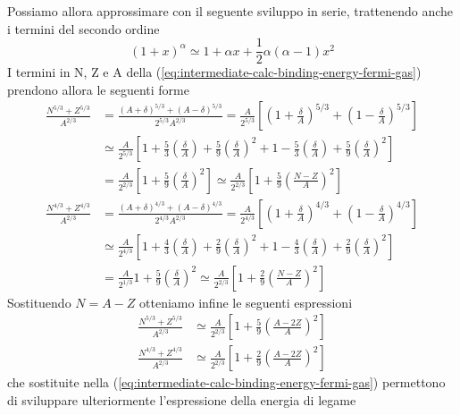 Possiamo allora approssimare con il seguente sviluppo in serie, trattenendo anche i termini del secondo ordine
\[
(1 + x)^{\alpha} \simeq 1 + \alpha x + \frac{1}{2} \alpha (\alpha - 1)x^{2}
\]
I termini in N, Z e A della (\ref{eq:intermediate-calc-binding-energy-fermi-gas}) prendono allora le seguenti forme
\begin{align*}
	\frac{N^{5/3}+Z^{5/3}}{ A^{2/3}} & = \frac{(A+\delta)^{5/3} + (A-\delta)^{5/3}}{2^{5/3} A^{2/3}} = \frac{A}{2^{5/3}} \left[ \left( 1+\frac{\delta}{A} \right)^{5/3} +\left( 1 - \frac{\delta}{A} \right)^{5/3} \right] \\
	& \simeq \frac{A}{2^{5/3}} \left[ 1 + \frac{5}{3}\left( \frac{\delta}{A} \right) + \frac{5}{9} \left( \frac{\delta}{A} \right)^{2} + 1 - \frac{5}{3} \left( \frac{\delta}{A} \right) + \frac{5}{9} \left( \frac{\delta}{A} \right)^{2} \right] \\
	& = \frac{A}{2^{2/3}}  \left[ 1+\frac{5}{9} \left( \frac{\delta}{A} \right)^{2} \right]
	\simeq \frac{A}{2^{2/3}} \left[ 1 + \frac{5}{9} \left( \frac{N-Z}{A} \right)^{2} \right]
\end{align*}
\begin{align*}
	\frac{N^{4/3}+Z^{4/3}}{ A^{2/3}} & = \frac{(A+\delta)^{4/3} + (A-\delta)^{4/3}}{2^{4/3} A^{2/3}} = \frac{A}{2^{4/3}} \left[ \left( 1+\frac{\delta}{A} \right)^{4/3} +\left( 1 - \frac{\delta}{A} \right)^{4/3} \right] \\
	& \simeq \frac{A}{2^{4/3}} \left[ 1 + \frac{4}{3}\left( \frac{\delta}{A} \right) + \frac{2}{9} \left( \frac{\delta}{A} \right)^{2} + 1 - \frac{4}{3} \left( \frac{\delta}{A} \right) + \frac{2}{9} \left( \frac{\delta}{A} \right)^{2} \right] \\
	& = \frac{A}{2^{1/3}}  1+\frac{5}{9} \left( \frac{\delta}{A} \right)^{2}
	\simeq \frac{A}{2^{2/3}} \left[ 1 + \frac{2}{9} \left( \frac{N-Z}{A} \right)^{2} \right]
\end{align*}
Sostituendo $N=A-Z$ otteniamo infine le seguenti espressioni
\begin{align*}
	\frac{N^{5/3}+Z^{5/3}}{ A^{2/3}} &\simeq \frac{A}{2^{2/3}} \left[ 1 + \frac{5}{9} \left( \frac{A-2Z}{A} \right)^{2} \right]\\
	\frac{N^{4/3}+Z^{4/3}}{ A^{2/3}} &\simeq \frac{A}{2^{2/3}} \left[ 1 + \frac{2}{9} \left( \frac{A-2Z}{A} \right)^{2} \right]
\end{align*}
che sostituite nella (\ref{eq:intermediate-calc-binding-energy-fermi-gas}) permettono di sviluppare ulteriormente
l’espressione della energia di legame
